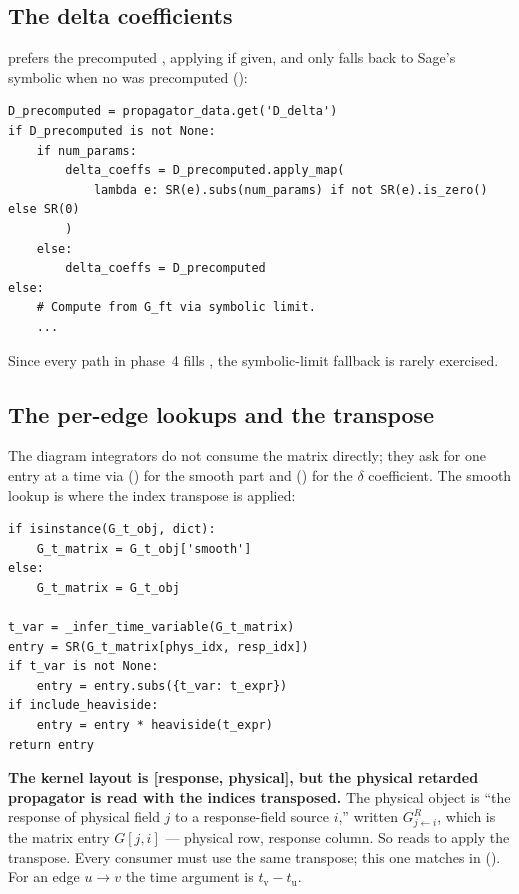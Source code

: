 \subsection{The delta coefficients}

 prefers the precomputed , applying
 if given, and only falls back to Sage's symbolic 
when no  was precomputed ():

\begin{lstlisting}
D_precomputed = propagator_data.get('D_delta')
if D_precomputed is not None:
    if num_params:
        delta_coeffs = D_precomputed.apply_map(
            lambda e: SR(e).subs(num_params) if not SR(e).is_zero() else SR(0)
        )
    else:
        delta_coeffs = D_precomputed
else:
    # Compute from G_ft via symbolic limit.
    ...
\end{lstlisting}

Since every path in phase~4 fills , the symbolic-limit fallback is
rarely exercised.

\subsection{The per-edge lookups and the transpose}

The diagram integrators do not consume the matrix directly; they ask for one
entry at a time via  () for the
smooth part and  () for the
$\delta$ coefficient. The smooth lookup is where the index transpose is applied:

\begin{lstlisting}
if isinstance(G_t_obj, dict):
    G_t_matrix = G_t_obj['smooth']
else:
    G_t_matrix = G_t_obj

t_var = _infer_time_variable(G_t_matrix)
entry = SR(G_t_matrix[phys_idx, resp_idx])
if t_var is not None:
    entry = entry.subs({t_var: t_expr})
if include_heaviside:
    entry = entry * heaviside(t_expr)
return entry
\end{lstlisting}

\begin{gotcha}
\textbf{The kernel layout is [response, physical], but the physical retarded
propagator is read with the indices transposed.} The physical object is ``the
response of physical field $j$ to a response-field source $i$,'' written $G^R_{j
\leftarrow i}$, which is the matrix entry $G[j, i]$ --- physical row, response
column. So  reads
 to apply the transpose. Every consumer must
use the same transpose; this one matches  in
 (). For an edge
$u \to v$ the time argument is $t_{\mathrm v} - t_{\mathrm u}$.
\end{gotcha}

